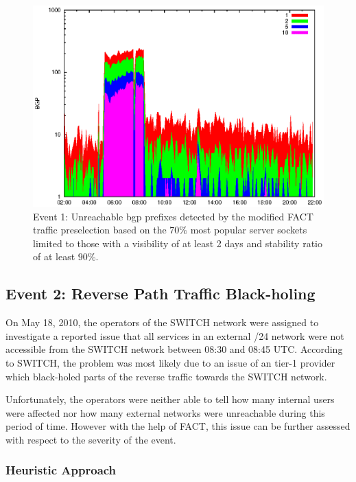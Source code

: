\begin{figure}
	[p] \centering 
	\includegraphics[width=0.75\linewidth]{images/events/2010_03_25/bgp_log_Set_var_0_1_stab_9_vts_2.eps} \caption{Event 1: Unreachable \gls{bgp} prefixes detected by the modified \gls{FACT} traffic preselection based on the $70\%$ most popular \glspl{server socket} limited to those with a visibility of at least 2 days and stability ratio of at least $90\%$.} 
	\label{fig:AMS_IX_FACT_popularVTS2STAB9} 
\end{figure}

\newpage 
\subsection{Event 2: Reverse Path Traffic Black-holing}

On May 18, 2010, the operators of the SWITCH network were assigned to investigate a reported issue that all services in an external /24 network were not accessible from the SWITCH network between 08:30 and 08:45 UTC. 
According to SWITCH, the problem was most likely due to an issue of an tier-1 provider which black-holed parts of the reverse traffic towards the SWITCH network\citep{SchatzmannPAM2011}.

Unfortunately, the operators were neither able to tell how many internal users were affected nor how many external networks were unreachable during this period of time. 
However with the help of \gls{FACT}, this issue can be further assessed with respect to the severity of the event\citep{SchatzmannPAM2011}.

\subsubsection{Heuristic Approach}

